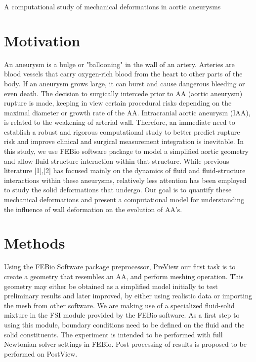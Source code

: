 \documentclass[11pt]{article}
\newcommand{\soptitle}{A computational study of mechanical deformations in aortic aneurysms}
\begin{document}
	
	\begin{center}
		\Large\soptitle
	\end{center}
	
	\section*{Motivation}
	An aneurysm is a bulge or "ballooning" in the wall of an artery. Arteries are blood vessels that carry oxygen-rich blood from the heart to other parts of the body. If an aneurysm grows large, it can burst and cause dangerous bleeding or even death. The decision to surgically intercede prior to AA (aortic aneurysm) rupture is made, keeping in view certain procedural risks depending on the maximal diameter or growth rate of the AA. Intracranial aortic aneurysm (IAA), is related to the weakening of arterial wall. Therefore, an immediate need to establish a robust and rigorous computational study to better predict rupture risk and improve clinical and surgical measurement integration is inevitable. In this study, we use FEBio software package to model a simplified aortic geometry and allow fluid structure interaction within that structure. While previous literature [1],[2] has focused mainly on the dynamics of fluid and fluid-structure interactions within these aneurysms, relatively less attention has been employed to study the solid deformations that undergo. Our goal is to quantify these mechanical deformations and present a computational model for understanding the influence of wall deformation on the evolution of AA's.  
	\section*{Methods}
	Using the FEBio Software package preprocessor, PreView our first task is to create a geometry that resembles an AA, and perform meshing operation. This geometry may either be obtained as a simplified model initially to test preliminary results and later improved, by either using realistic data or importing the mesh from other software. We are making use of a specialized fluid-solid mixture in the FSI module provided by the FEBio software. As a first step to using this module, boundary conditions need to be defined on the fluid and the solid constituents. The experiment is intended to be performed with full Newtonian solver settings in FEBio. Post processing of results is proposed to be performed on PostView. 
\end{document}
